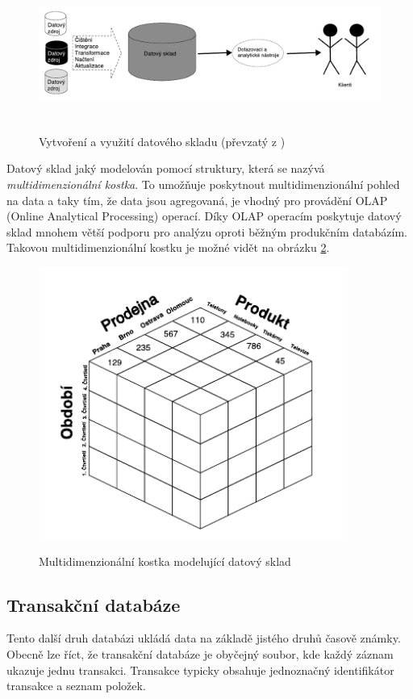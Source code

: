 \begin{figure}[h]\centering
  \centering
  \includegraphics[width=\linewidth,height=1.7in]{obrazky/datovy-sklad-arch.pdf}\\[1pt]
  \caption{Vytvoření a využití datového skladu (převzatý z \cite{Han})}
  \label{datove-sklady}
\end{figure}

Datový sklad jaký modelován pomocí struktury, která se nazývá \textit{multidimenzionální kostka}. 
To umožňuje poskytnout multidimenzionální pohled na data a taky tím, že data jsou agregovaná, je vhodný pro provádění OLAP (Online Analytical Processing) operací.
Díky OLAP operacím poskytuje datový sklad mnohem větší podporu pro analýzu oproti běžným produkčním databázím. Takovou multidimenzionální kostku je možné vidět na obrázku \ref{kostka}. \cite{Han}

\begin{figure}[h]\centering
  \centering
  \includegraphics[width=4in,height=3.5in]{obrazky/kostka.pdf}\\[1pt]
  \caption{Multidimenzionální kostka modelující datový sklad}
  \label{kostka}
\end{figure}

\subsection*{Transakční databáze}
Tento další druh databázi ukládá data na základě jistého druhů časově známky. Obecně lze říct, že transakční databáze je obyčejný soubor, kde každý záznam ukazuje jednu transakci. Transakce typicky obsahuje jednoznačný identifikátor transakce a seznam položek. \cite{Han}

